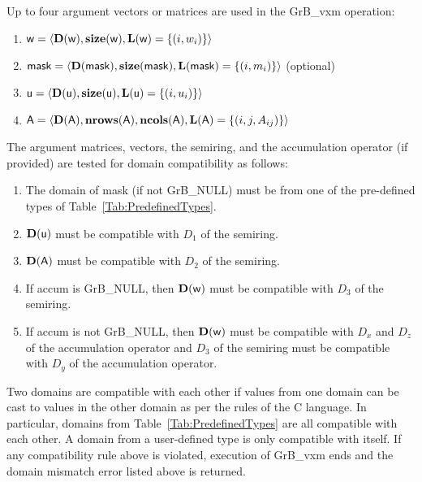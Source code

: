Up to four argument vectors or matrices are used in the {\sf GrB\_vxm} operation:
\begin{enumerate}
	\item ${\sf w} = \langle \bold{D}({\sf w}),\bold{size}({\sf w}),\bold{L}({\sf w}) = \{(i,w_i) \} \rangle$
	\item ${\sf mask} = \langle \bold{D}({\sf mask}),\bold{size}({\sf mask}),\bold{L}({\sf mask}) = \{(i,m_i) \} \rangle$ (optional)
	\item ${\sf u} = \langle \bold{D}({\sf u}),\bold{size}({\sf u}),\bold{L}({\sf u}) = \{(i,u_i) \} \rangle$
	\item ${\sf A} = \langle \bold{D}({\sf A}),\bold{nrows}({\sf A}), \bold{ncols}({\sf A}),\bold{L}({\sf A}) = \{(i,j,A_{ij}) \} \rangle$
\end{enumerate}

The argument matrices, vectors, the semiring, and the accumulation operator (if provided) 
are tested for domain compatibility as follows:
\begin{enumerate}
	\item The domain of {\sf mask} (if not {\sf GrB\_NULL}) must be from one of the pre-defined types of Table~\ref{Tab:PredefinedTypes}.

	\item $\bold{D}({\sf u})$ must be compatible with $D_1$ of the semiring.

	\item $\bold{D}({\sf A})$ must be compatible with $D_2$ of the semiring.

	\item If {\sf accum} is {\sf GrB\_NULL}, then $\bold{D}({\sf w})$ must be compatible with $D_3$ of the semiring.

	\item If {\sf accum} is not {\sf GrB\_NULL}, then $\bold{D}({\sf w})$ must be compatible with $D_x$ and $D_z$ of the 
	accumulation operator and $D_3$ of the semiring must be compatible with $D_y$ of the accumulation operator.
\end{enumerate}
Two domains are compatible with each other if values from one domain can be cast 
to values in the other domain as per the rules of the C language.
In particular, domains from Table~\ref{Tab:PredefinedTypes} are all compatible 
with each other. A domain from a user-defined type is only compatible with itself.
If any compatibility rule above is violated, execution of {\sf GrB\_vxm} ends and 
the domain mismatch error listed above is returned.

